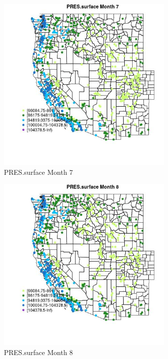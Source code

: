 \begin{figure} 
\centering  
\includegraphics[width=0.77\textwidth]{Code_Outputs/Report_ML_input_PM25_Step4_part_e_de_duplicated_aves_compiled_2019-05-21wNAs_MapObsMo7PRESsurface.jpg} 
\caption{\label{fig:Report_ML_input_PM25_Step4_part_e_de_duplicated_aves_compiled_2019-05-21wNAsMapObsMo7PRESsurface}PRES.surface Month 7} 
\end{figure} 
 

\begin{figure} 
\centering  
\includegraphics[width=0.77\textwidth]{Code_Outputs/Report_ML_input_PM25_Step4_part_e_de_duplicated_aves_compiled_2019-05-21wNAs_MapObsMo8PRESsurface.jpg} 
\caption{\label{fig:Report_ML_input_PM25_Step4_part_e_de_duplicated_aves_compiled_2019-05-21wNAsMapObsMo8PRESsurface}PRES.surface Month 8} 
\end{figure} 
 

